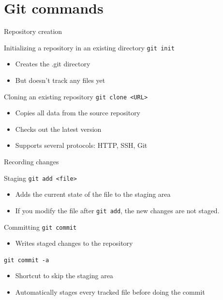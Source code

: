 \documentclass{beamer}
\begin{document}
\section{Git commands}
\begin{frame}{Repository creation}
  \begin{block}{Initializing a repository in an existing directory}
    \texttt{git init}
    \begin{itemize}
    \item Creates the .git directory
    \item But doesn't track any files yet
    \end{itemize}
  \end{block}
  \begin{block}{Cloning an existing repository}
    \texttt{git clone <URL>}
    \begin{itemize}
    \item Copies all data from the source repository
    \item Checks out the latest version
    \item Supports several protocols: HTTP, SSH, Git
    \end{itemize}
  \end{block}
\end{frame}

\begin{frame}{Recording changes}
  \begin{block}{Staging}
    \texttt{git add <file>}
    \begin{itemize}
    \item Adds the current state of the file to the staging area
    \item If you modify the file after \texttt{git add}, the \alert{new changes are not staged}.
    \end{itemize}
  \end{block}
  \begin{block}{Committing}
    \texttt{git commit}
    \begin{itemize}
    \item Writes staged changes to the repository
    \end{itemize}
    \texttt{git commit -a}
    \begin{itemize}
    \item Shortcut to skip the staging area
    \item Automatically stages every tracked file before doing the commit
    \end{itemize}
  \end{block}
\end{frame}
\end{document}
